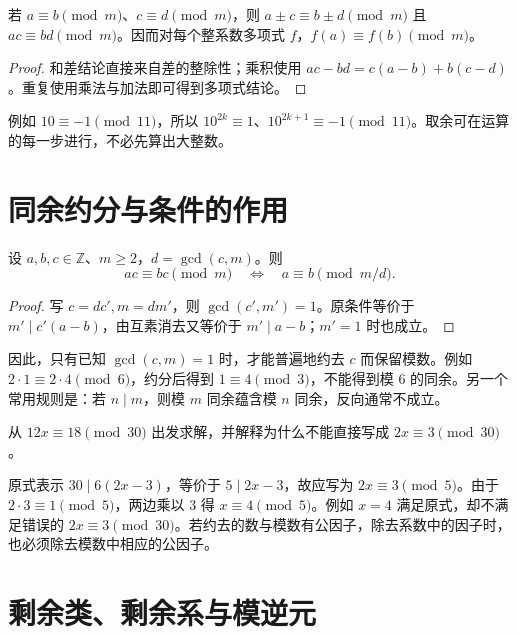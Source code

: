 \documentclass[UTF8,12pt,a4paper,fontset=fandol]{ctexbook}
\begin{document}
\begin{proposition}
若 $a\equiv b\pmod m$、$c\equiv d\pmod m$，则 $a\pm c\equiv b\pm d\pmod m$ 且 $ac\equiv bd\pmod m$。因而对每个整系数多项式 $f$，$f(a)\equiv f(b)\pmod m$。
\end{proposition}
\begin{proof}
和差结论直接来自差的整除性；乘积使用 $ac-bd=c(a-b)+b(c-d)$。重复使用乘法与加法即可得到多项式结论。
\end{proof}

例如 $10\equiv-1\pmod{11}$，所以 $10^{2k}\equiv1$、$10^{2k+1}\equiv-1\pmod{11}$。取余可在运算的每一步进行，不必先算出大整数。

\section{同余约分与条件的作用}

\begin{proposition}[约分法则]
\label{prop:congruence-cancellation}
设 $a,b,c\in\mathbb Z$、$m\ge2$，$d=\gcd(c,m)$。则
\begin{equation}
 ac\equiv bc\pmod m
 \quad\Longleftrightarrow\quad
 a\equiv b\pmod{m/d}.
 \label{eq:congruence-cancellation}
\end{equation}
\end{proposition}
\begin{proof}
写 $c=dc',m=dm'$，则 $\gcd(c',m')=1$。原条件等价于 $m'\mid c'(a-b)$，由互素消去又等价于 $m'\mid a-b$；$m'=1$ 时也成立。
\end{proof}

因此，只有已知 $\gcd(c,m)=1$ 时，才能普遍地约去 $c$ 而保留模数。例如 $2\cdot1\equiv2\cdot4\pmod6$，约分后得到 $1\equiv4\pmod3$，不能得到模 $6$ 的同余。另一个常用规则是：若 $n\mid m$，则模 $m$ 同余蕴含模 $n$ 同余，反向通常不成立。

\begin{example}[约分同时改变了什么]
从 $12x\equiv18\pmod{30}$ 出发求解，并解释为什么不能直接写成 $2x\equiv3\pmod{30}$。
\end{example}
\begin{solve}
原式表示 $30\mid6(2x-3)$，等价于 $5\mid2x-3$，故应写为 $2x\equiv3\pmod5$。由于 $2\cdot3\equiv1\pmod5$，两边乘以 $3$ 得 $x\equiv4\pmod5$。例如 $x=4$ 满足原式，却不满足错误的 $2x\equiv3\pmod{30}$。若约去的数与模数有公因子，除去系数中的因子时，也必须除去模数中相应的公因子。
\end{solve}

\section{剩余类、剩余系与模逆元}
\end{document}
